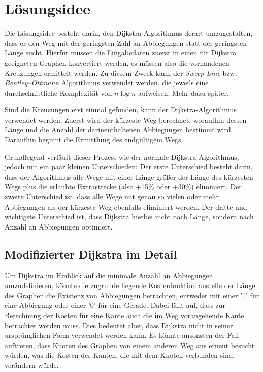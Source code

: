 \documentclass{article}
\theoremstyle{nonumberplain}
\begin{document}
    
\section{Lösungsidee}

Die Lösungsidee besteht darin, den Dijkstra Algorithmus derart umzugestalten, dass er den Weg mit der geringsten Zahl an Abbiegungen statt der geringsten Länge sucht.
Hierfür müssen die Eingabedaten zuerst in einen für Dijkstra geeigneten Graphen konvertiert werden, es müssen also die vorhandenen Kreuzungen ermittelt werden. Zu diesem Zweck
kann der {\em Sweep-Line} bzw. {\em Bentley–Ottmann} Algorithmus verwendet werden, die jeweils eine durchschnittliche Komplexität von $n \log n$ aufweisen. Mehr dazu später.

Sind die Kreuzungen erst einmal gefunden, kann der Dijkstra-Algorithmus verwendet werden.
Zuerst wird der kürzeste Weg berechnet, woraufhin dessen Länge und die Anzahl der darinenthaltenen Abbiegungen bestimmt wird. Daraufhin beginnt die Ermittlung des endgültigem Wegs.

Grundlegend verläuft dieser Prozess wie der normale Dijkstra Algorithmus, jedoch mit ein paar kleinen Unterschieden:
Der erste Unterschied besteht darin, dass der Algorithmus alle Wege mit einer Länge größer der Länge des kürzesten Wegs plus die erlaubte Extrastrecke (also +15\% oder +30\%) eliminiert.
Der zweite Unterschied ist, dass alle Wege mit genau so vielen oder mehr Abbiegungen als der kürzeste Weg ebenfalls eliminiert werden.
Der dritte und wichtigste Unterschied ist, dass Dijkstra hierbei nicht nach Länge, sondern nach Anzahl an Abbiegungen optimiert.

\subsection{Modifizierter Dijkstra im Detail}

Um Dijkstra im Hinblick auf die minimale Anzahl an Abbiegungen umzudefinieren, könnte die zugrunde liegende Kostenfunktion anstelle der Länge des Graphen die Existenz von Abbiegungen betrachten, entweder mit einer '1' für eine Abbiegung oder einer '0' für eine Gerade. 
Dabei fällt auf, dass zur Berechnung der Kosten für eine Kante auch die im Weg vorangehende Kante betrachtet werden muss.
Dies bedeutet aber, dass Dijkstra nicht in seiner ursprünglichen Form verwendet werden kann. Es könnte ansonsten der Fall auftreten, dass Knoten des Graphen von einem anderen Weg aus erneut besucht würden, was die Kosten der Kanten, die mit dem Knoten verbunden sind, verändern würde.
\end{document}
